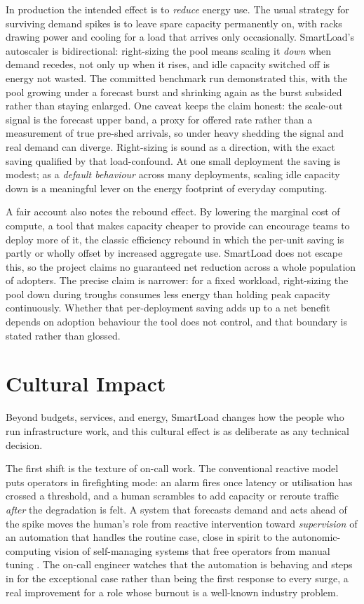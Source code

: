 In production the intended effect is to \emph{reduce} energy use. The usual strategy for
surviving demand spikes is to leave spare capacity permanently on, with racks drawing
power and cooling for a load that arrives only occasionally. SmartLoad's autoscaler is
bidirectional: right-sizing the pool means scaling it \emph{down} when demand recedes,
not only up when it rises, and idle capacity switched off is energy not wasted. The
committed benchmark run demonstrated this, with the pool growing under a forecast burst
and shrinking again as the burst subsided rather than staying enlarged. One caveat
keeps the claim honest: the scale-out signal is the
forecast upper band, a proxy for offered rate rather than a measurement of true pre-shed
arrivals, so under heavy shedding the signal and real demand can diverge. Right-sizing
is sound as a direction, with the exact saving qualified by that load-confound. At one
small deployment the saving is modest; as a \emph{default behaviour} across many
deployments, scaling idle capacity down is a meaningful lever on the energy footprint of
everyday computing.

A fair account also notes the rebound effect. By lowering the marginal cost of compute,
a tool that makes capacity cheaper to provide can encourage teams to deploy more of it,
the classic efficiency rebound in which the per-unit saving is partly or wholly offset
by increased aggregate use. SmartLoad does not escape this, so the project claims no
guaranteed net reduction across a whole population of adopters. The precise claim is
narrower: for a fixed workload, right-sizing the pool down during troughs consumes less
energy than holding peak capacity continuously. Whether that per-deployment saving adds
up to a net benefit depends on adoption behaviour the tool does not control, and that
boundary is stated rather than glossed.

\section{Cultural Impact}
\label{disc:cultural}

Beyond budgets, services, and energy, SmartLoad changes how the people who run
infrastructure work, and this cultural effect is as deliberate as any technical
decision.

The first shift is the texture of on-call work. The conventional reactive model puts
operators in firefighting mode: an alarm fires once latency or utilisation has crossed a
threshold, and a human scrambles to add capacity or reroute traffic \emph{after} the
degradation is felt. A system that forecasts demand and acts ahead of the spike moves
the human's role from reactive intervention toward \emph{supervision} of an automation
that handles the routine case, close in spirit to the autonomic-computing vision of
self-managing systems that free operators from manual tuning \cite{kephart2003autonomic}.
The on-call engineer watches that the automation is behaving and steps in for the
exceptional case rather than being the first response to every surge, a real improvement
for a role whose burnout is a well-known industry problem.

